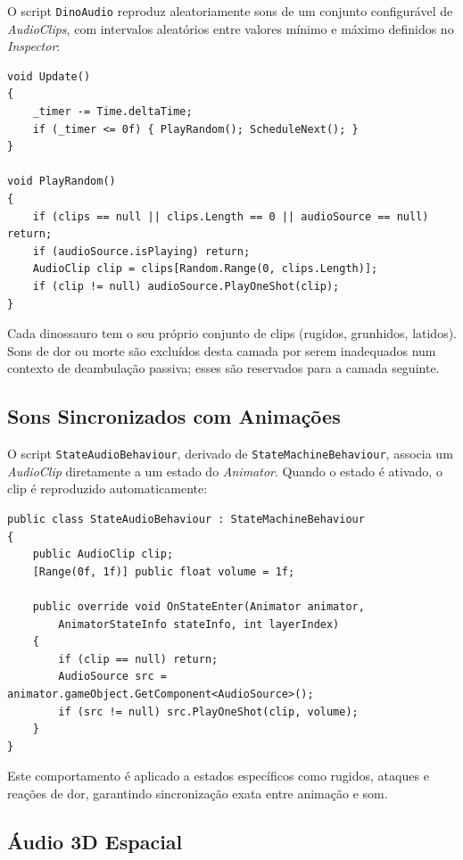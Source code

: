 \documentclass[a4paper,11pt]{report}
\newcommand{\code}[1]{\texttt{#1}}
\begin{document}
O script \code{DinoAudio} reproduz aleatoriamente sons de um conjunto configurável
de \textit{AudioClips}, com intervalos aleatórios entre valores mínimo e máximo
definidos no \textit{Inspector}:

\begin{lstlisting}[caption={Excerto de DinoAudio.cs --- sons periódicos.},
                   label={lst:dinoaudio}]
void Update()
{
    _timer -= Time.deltaTime;
    if (_timer <= 0f) { PlayRandom(); ScheduleNext(); }
}

void PlayRandom()
{
    if (clips == null || clips.Length == 0 || audioSource == null) return;
    if (audioSource.isPlaying) return;
    AudioClip clip = clips[Random.Range(0, clips.Length)];
    if (clip != null) audioSource.PlayOneShot(clip);
}
\end{lstlisting}

Cada dinossauro tem o seu próprio conjunto de clips (rugidos, grunhidos, latidos).
Sons de dor ou morte são excluídos desta camada por serem inadequados num contexto
de deambulação passiva; esses são reservados para a camada seguinte.

\subsection{Sons Sincronizados com Animações}

O script \code{StateAudioBehaviour}, derivado de \code{StateMachineBehaviour},
associa um \textit{AudioClip} diretamente a um estado do \textit{Animator}.
Quando o estado é ativado, o clip é reproduzido automaticamente:

\begin{lstlisting}[caption={StateAudioBehaviour.cs --- som acionado por estado do Animator.},
                   label={lst:stateaudio}]
public class StateAudioBehaviour : StateMachineBehaviour
{
    public AudioClip clip;
    [Range(0f, 1f)] public float volume = 1f;

    public override void OnStateEnter(Animator animator,
        AnimatorStateInfo stateInfo, int layerIndex)
    {
        if (clip == null) return;
        AudioSource src = animator.gameObject.GetComponent<AudioSource>();
        if (src != null) src.PlayOneShot(clip, volume);
    }
}
\end{lstlisting}

Este comportamento é aplicado a estados específicos como rugidos, ataques e
reações de dor, garantindo sincronização exata entre animação e som.

\subsection{Áudio 3D Espacial}
\end{document}

